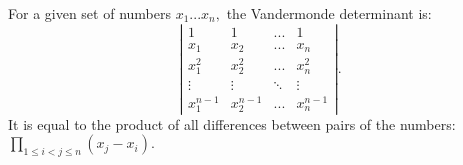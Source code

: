 For a given set of numbers $x_{1}...x_{n},$  the Vandermonde determinant is:
\[ \left | 
\begin{array}{cccc} 
  1 & 1 & ... & 1 \\
  x_1 & x_2 & ... & x_n \\
  x_1^2 & x_2^2 & ... & x_n^2 \\
  \vdots & \vdots & \ddots & \vdots \\
  x_1^{n-1} & x_2 ^{n-1} & ... & x_n^{n-1} 
\end{array} 
\right | . \]
It is equal to the product of all differences between pairs of the numbers: $ \prod _{1 \leq i < j \leq n}(x_j - x_i).$
  
  
  
  
  
  